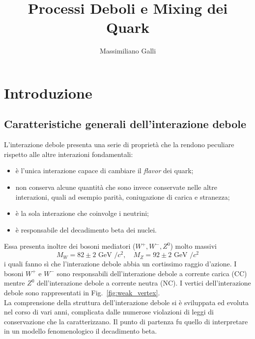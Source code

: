 \documentclass{subnucbo}
\title{Processi Deboli e Mixing dei Quark}
\author{Massimiliano Galli}
\begin{document}
\maketitle

\begin{abstract}
\end{abstract}

\section{Introduzione}
\subsection{Caratteristiche generali dell'interazione debole}
L'interazione debole presenta una serie di proprietà che la rendono peculiare rispetto alle altre interazioni fondamentali:
\begin{itemize}
        \item è l'unica interazione capace di cambiare il \textit{flavor} dei quark;
        \item non conserva alcune quantità che sono invece conservate nelle altre interazioni, quali ad esempio parità, coniugazione di carica e stranezza;
        \item è la sola interazione che coinvolge i neutrini;
        \item è responsabile del decadimento beta dei nuclei.
\end{itemize}
Essa presenta inoltre dei bosoni mediatori ($W^{+}, W^{-}, Z^{0}$) molto massivi
\begin{equation}
        M _ { W } = 82 \pm 2 \text { GeV } / c ^ { 2 } , \quad M _ { Z } = 92 \pm 2 \text { GeV } / c ^ { 2 }
        \label{eq:bosons_masses}
\end{equation}
i quali fanno sì che l'interazione debole abbia un cortissimo raggio d'azione. I bosoni $W^{+}$ e $W^{-}$ sono responsabili dell'interazione debole a corrente carica (CC) mentre $Z^{0}$ dell'interazione debole a corrente neutra (NC). I vertici dell'interazione debole sono rappresentati in Fig.~\ref{fig:weak_vertex}. \\
La comprensione della struttura dell'interazione debole si è sviluppata ed evoluta nel corso di vari anni, complicata dalle numerose violazioni di leggi di conservazione che la caratterizzano. Il punto di partenza fu quello di interpretare in un modello fenomenologico il decadimento beta.
\end{document}
